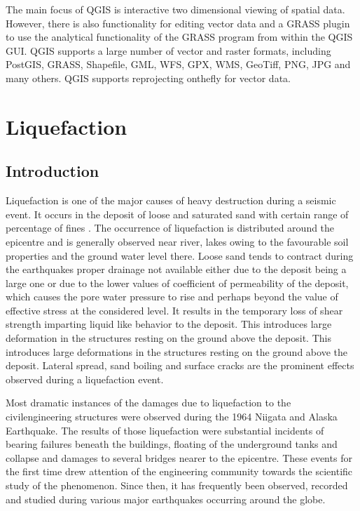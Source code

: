 The main focus of QGIS is interactive two dimensional viewing of spatial data. However, there is also functionality for editing vector data and a GRASS plugin to use the analytical functionality of the GRASS program from within the QGIS GUI. QGIS supports a large number of vector and raster formats, including PostGIS, GRASS, Shapefile, GML, WFS, GPX, WMS, GeoTiff, PNG, JPG and many others. QGIS supports reprojecting on\-the\-fly for vector data.
\section{Liquefaction}
\subsection{Introduction}
Liquefaction is one of the major causes of heavy destruction during a seismic event. It occurs in the deposit of loose and saturated sand with certain range of percentage of fines \cite{r11}. The occurrence of liquefaction is distributed around the epicentre and is generally observed near river, lakes owing to the favourable soil properties and the ground water level there.  Loose sand tends to contract during the earthquakes proper drainage not available either due to the deposit being a large one or due to the lower values of coefficient of permeability of the deposit, which causes the pore water pressure to rise and perhaps beyond the value of effective stress at the considered level. It results in the temporary loss of shear strength imparting liquid like behavior to the deposit. This introduces large deformation in the structures resting on the ground above the deposit.  This introduces large deformations in the structures resting on the ground above the deposit. Lateral spread, sand boiling and surface cracks are the prominent effects observed during a liquefaction event.

Most dramatic instances of the damages due to liquefaction to the civil\-engineering structures were observed during the 1964 Niigata and Alaska Earthquake. The results of those liquefaction were substantial incidents of bearing failures beneath the buildings, floating of the underground tanks and collapse and damages to several bridges nearer to the epicentre. These events for the first time drew attention of the engineering community towards the scientific study of the phenomenon. Since then, it has frequently been observed, recorded and studied during various major earthquakes occurring around the globe. 

